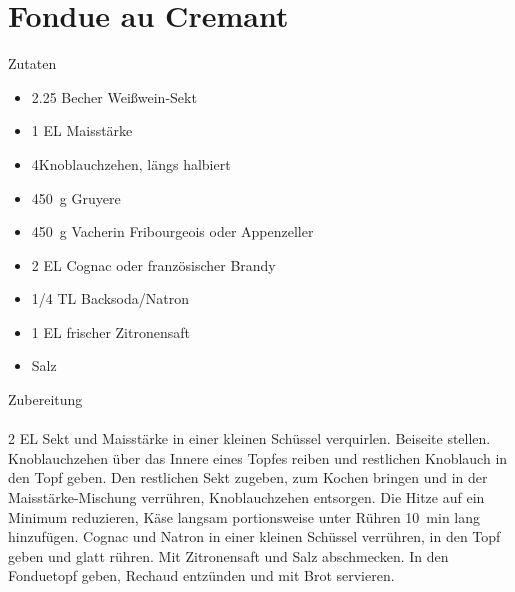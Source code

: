 \section*{Fondue au Cremant}
\ihead{}\ohead{}
\cfoot{}
{\Large Zutaten}
\begin{multicols}{2}
\begin{itemize}
    \item \num{2.25} Becher Weißwein-Sekt
    \item \num{1} EL Maisstärke
    \item \num{4}Knoblauchzehen, längs halbiert
    \item \SI{450}{g} Gruyere
    \item \SI{450}{g} Vacherin Fribourgeois oder Appenzeller
    \item \num{2} EL Cognac oder französischer Brandy
    \item \num{1/4} TL Backsoda/Natron
    \item \num{1} EL frischer Zitronensaft
    \item Salz
\end{itemize}
\end{multicols}
\noindent
{\Large Zubereitung}\\
\\
\num{2} EL Sekt und Maisstärke in einer kleinen Schüssel verquirlen. 
Beiseite stellen. 
Knoblauchzehen über das Innere eines Topfes reiben und restlichen Knoblauch in den Topf geben. 
Den restlichen Sekt zugeben, zum Kochen bringen und in der Maisstärke-Mischung verrühren, Knoblauchzehen entsorgen. 
Die Hitze auf ein Minimum reduzieren, Käse langsam portionsweise unter Rühren \SI{10}{min} lang hinzufügen. 
Cognac und Natron in einer kleinen Schüssel verrühren, in den Topf geben und glatt rühren. 
Mit Zitronensaft und Salz abschmecken. 
In den Fonduetopf geben, Rechaud entzünden und mit Brot servieren.

